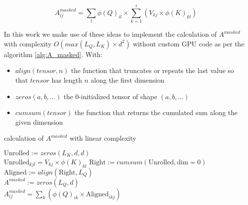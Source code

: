 \begin{equation}
A^{masked}_{ij}= \sum_l \phi(Q)_{il} \times \sum_{k=1}^i \left(V_{kj} \times \phi(K)_{kl} \right)
\end{equation}

In this work we make use of these ideas to implement the calculation of
 $A^{masked}$ with complexity $O(max(L_Q, L_K) \times d^2)$ without
 custom GPU code as per the algorithm \ref{alg:A_masked}. With:
 \begin{itemize}
 	\item $align(tensor, n)$ the function that truncates or repeats the last value so that $tensor$ has length $n$ along the first dimension
 	\item $zeros(a, b, ...)$ the 0-initialized tensor of shape $(a, b, ...)$
 	\item $cumsum(tensor)$ the function that returns the cumulated sum along the given dimension
 \end{itemize}

\begin{algorithm}[H]
	\caption{calculation of $A^{masked}$ with linear complexity}
	\label{alg:A_masked}
	$\text{Unrolled} := zeros(L_K, d, d)$\\
	{
		{
			$\text{Unrolled}_{kjl} = V_{kj} \times \phi(K)_{kl}$
		}
	}
	$\text{Right} := cumsum\left(\text{Unrolled}, \text{dim}=0\right)$\\
	$\text{Aligned} := align(\text{Right}, L_Q)$\\
	$A^{masked} := zeros(L_Q, d)$\\
	{
		{
			$A^{masked}_{ij} = \sum_k \left( \phi(Q)_{ik} \times \text{Aligned}_{ikj} \right)$
		}
	}
\end{algorithm}
